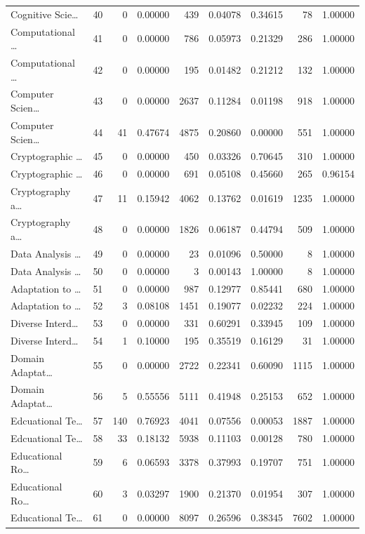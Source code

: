 \begin{table}
\begin{tabular}{lrrrrrrrr}
Cognitive Scie… & 40 & 0 & 0.00000 & 439 & 0.04078 & 0.34615 & 78 & 1.00000 \\
Computational … & 41 & 0 & 0.00000 & 786 & 0.05973 & 0.21329 & 286 & 1.00000 \\
Computational … & 42 & 0 & 0.00000 & 195 & 0.01482 & 0.21212 & 132 & 1.00000 \\
Computer Scien… & 43 & 0 & 0.00000 & 2637 & 0.11284 & 0.01198 & 918 & 1.00000 \\
Computer Scien… & 44 & 41 & 0.47674 & 4875 & 0.20860 & 0.00000 & 551 & 1.00000 \\
Cryptographic … & 45 & 0 & 0.00000 & 450 & 0.03326 & 0.70645 & 310 & 1.00000 \\
Cryptographic … & 46 & 0 & 0.00000 & 691 & 0.05108 & 0.45660 & 265 & 0.96154 \\
Cryptography a… & 47 & 11 & 0.15942 & 4062 & 0.13762 & 0.01619 & 1235 & 1.00000 \\
Cryptography a… & 48 & 0 & 0.00000 & 1826 & 0.06187 & 0.44794 & 509 & 1.00000 \\
Data Analysis … & 49 & 0 & 0.00000 & 23 & 0.01096 & 0.50000 & 8 & 1.00000 \\
Data Analysis … & 50 & 0 & 0.00000 & 3 & 0.00143 & 1.00000 & 8 & 1.00000 \\
Adaptation to … & 51 & 0 & 0.00000 & 987 & 0.12977 & 0.85441 & 680 & 1.00000 \\
Adaptation to … & 52 & 3 & 0.08108 & 1451 & 0.19077 & 0.02232 & 224 & 1.00000 \\
Diverse Interd… & 53 & 0 & 0.00000 & 331 & 0.60291 & 0.33945 & 109 & 1.00000 \\
Diverse Interd… & 54 & 1 & 0.10000 & 195 & 0.35519 & 0.16129 & 31 & 1.00000 \\
Domain Adaptat… & 55 & 0 & 0.00000 & 2722 & 0.22341 & 0.60090 & 1115 & 1.00000 \\
Domain Adaptat… & 56 & 5 & 0.55556 & 5111 & 0.41948 & 0.25153 & 652 & 1.00000 \\
Edcuational Te… & 57 & 140 & 0.76923 & 4041 & 0.07556 & 0.00053 & 1887 & 1.00000 \\
Edcuational Te… & 58 & 33 & 0.18132 & 5938 & 0.11103 & 0.00128 & 780 & 1.00000 \\
Educational Ro… & 59 & 6 & 0.06593 & 3378 & 0.37993 & 0.19707 & 751 & 1.00000 \\
Educational Ro… & 60 & 3 & 0.03297 & 1900 & 0.21370 & 0.01954 & 307 & 1.00000 \\
Educational Te… & 61 & 0 & 0.00000 & 8097 & 0.26596 & 0.38345 & 7602 & 1.00000 \\

\end{tabular}
\end{table}
